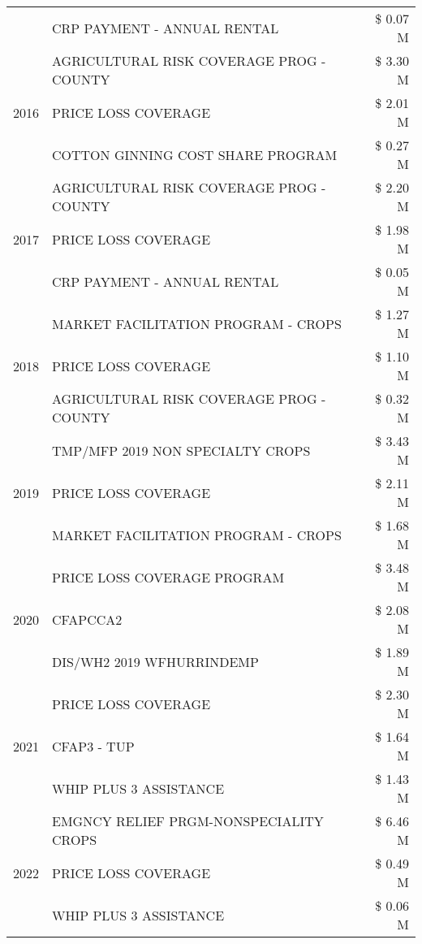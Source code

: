 \begin{tabular}{llr}
 & CRP PAYMENT - ANNUAL RENTAL & \$ 0.07 M \\
\cline{1-3}
\multirow[t]{3}{*}{2016} & AGRICULTURAL RISK COVERAGE PROG - COUNTY & \$ 3.30 M \\
 & PRICE LOSS COVERAGE & \$ 2.01 M \\
 & COTTON GINNING COST SHARE PROGRAM & \$ 0.27 M \\
\cline{1-3}
\multirow[t]{3}{*}{2017} & AGRICULTURAL RISK COVERAGE PROG - COUNTY & \$ 2.20 M \\
 & PRICE LOSS COVERAGE & \$ 1.98 M \\
 & CRP PAYMENT - ANNUAL RENTAL & \$ 0.05 M \\
\cline{1-3}
\multirow[t]{3}{*}{2018} & MARKET FACILITATION PROGRAM - CROPS & \$ 1.27 M \\
 & PRICE LOSS COVERAGE & \$ 1.10 M \\
 & AGRICULTURAL RISK COVERAGE PROG - COUNTY & \$ 0.32 M \\
\cline{1-3}
\multirow[t]{3}{*}{2019} & TMP/MFP 2019 NON SPECIALTY CROPS & \$ 3.43 M \\
 & PRICE LOSS COVERAGE & \$ 2.11 M \\
 & MARKET FACILITATION PROGRAM - CROPS & \$ 1.68 M \\
\cline{1-3}
\multirow[t]{3}{*}{2020} & PRICE LOSS COVERAGE PROGRAM & \$ 3.48 M \\
 & CFAPCCA2 & \$ 2.08 M \\
 & DIS/WH2 2019 WFHURRINDEMP & \$ 1.89 M \\
\cline{1-3}
\multirow[t]{3}{*}{2021} & PRICE LOSS COVERAGE & \$ 2.30 M \\
 & CFAP3 - TUP & \$ 1.64 M \\
 & WHIP PLUS 3 ASSISTANCE & \$ 1.43 M \\
\cline{1-3}
\multirow[t]{3}{*}{2022} & EMGNCY RELIEF PRGM-NONSPECIALITY CROPS & \$ 6.46 M \\
 & PRICE LOSS COVERAGE & \$ 0.49 M \\
 & WHIP PLUS 3 ASSISTANCE & \$ 0.06 M \\
\cline{1-3}
\bottomrule
\end{tabular}
